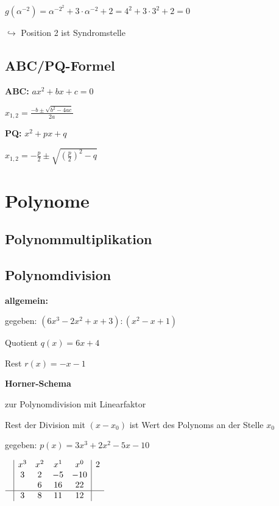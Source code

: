 $g(\alpha^{-2}) = \alpha^{-2^2} + 3 \cdot \alpha^{-2} + 2 = 4^2 + 3 \cdot 3^2 + 2 = 0$

$\hookrightarrow$ Position 2 ist Syndromstelle

\subsection{ABC/PQ-Formel}

\textbf{ABC:} $ax^2 + bx + c = 0$

$\displaystyle{
    x_{1,2} = \frac{-b \pm \sqrt{ b^2 - 4ac }}{2a}
}$

\textbf{PQ:} $x^2 + px + q$

$\displaystyle{
    x_{1,2} = -\frac{p}{2} \pm \sqrt{\left(\frac{p}{2}\right)^2 - q}
}$

\section{Polynome}

\subsection{Polynommultiplikation}

\subsection{Polynomdivision}

\textbf{allgemein:}

gegeben: $(6x^3-2x^2+x+3) : (x^2-x+1)$


Quotient $q(x) = 6x + 4$

Rest $r(x) = - x - 1$

\textbf{Horner-Schema}

zur Polynomdivision mit Linearfaktor

Rest der Division mit $(x - x_0)$ ist Wert des Polynoms an der Stelle $x_0$

gegeben: $p(x) = 3x^3 + 2x^2 - 5x - 10$

$\begin{array}{c|cccc|c}
    & x^3 & x^2 & x^1 & x^0 & 2\\
    & 3   & 2   & -5  & -10 & \\
    &     & 6   & 16  & 22  \\ \hline
    & 3   & 8   & 11  & \multicolumn{1}{c|}{12}   &
\end{array}$

